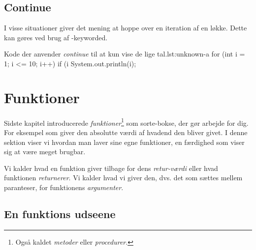 
	\subsection{Continue}

		I visse situationer giver det mening at hoppe over en iteration af en
		løkke. Dette kan gøres ved brug af -keyworded.

		\begin{JavaCode}{Kode der anvender \emph{continue} til at kun vise de lige tal.}{lst:unknown-a}
			for (int i = 1; i <= 10; i++) {
				if (i %
				System.out.println(i);
			}
		\end{JavaCode}



\section{Funktioner}

	Sidste kapitel introducerede \emph{funktioner}\footnote{Også kaldet \emph{metoder} eller \emph{procedurer}.}
	som sorte-bokse, der gør arbejde for dig. For eksempel 
	som giver den absolutte værdi af hvadend den bliver givet. I denne sektion
	viser vi hvordan man laver sine egne funktioner, en færdighed som viser
	sig at være meget brugbar.

    Vi kalder hvad en funktion giver tilbage for dens
    \emph{retur-værdi} eller hvad funktionen \emph{returnerer}. Vi
    kalder hvad vi giver den, dvs. det som sættes mellem paranteser,
    for funktionens \emph{argumenter}.




	\subsection{En funktions udseene}

